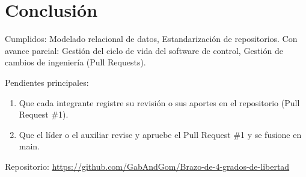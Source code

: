 \documentclass[a4paper,11pt]{article}
\begin{document}
\section{Conclusión}
Cumplidos: Modelado relacional de datos, Estandarización de repositorios. Con avance parcial: Gestión del ciclo de vida del software de control, Gestión de cambios de ingeniería (Pull Requests).
\par\smallskip Pendientes principales:
\begin{enumerate}
\item Que cada integrante registre su revisión o sus aportes en el repositorio (Pull Request \#1).
\item Que el líder o el auxiliar revise y apruebe el Pull Request \#1 y se fusione en main.
\end{enumerate}
\par\smallskip\noindent Repositorio: \url{https://github.com/GabAndGom/Brazo-de-4-grados-de-libertad}
\end{document}
